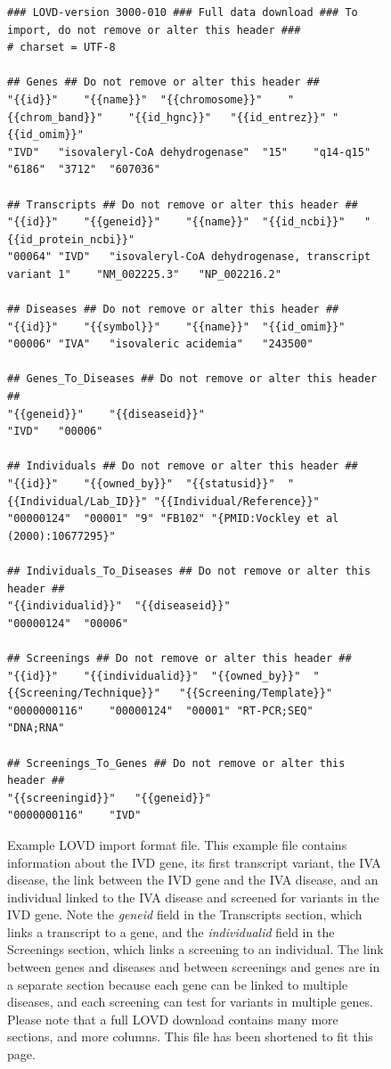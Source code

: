 \documentclass[a4paper,oneside,openany,12pt]{memoir}
\begin{document}
\begin{figure}[ht]
  \begin{shaded}
    \scriptsize
    \begin{verbatim}
### LOVD-version 3000-010 ### Full data download ### To import, do not remove or alter this header ###
# charset = UTF-8

## Genes ## Do not remove or alter this header ##
"{{id}}"	"{{name}}"	"{{chromosome}}"	"{{chrom_band}}"	"{{id_hgnc}}"	"{{id_entrez}}"	"{{id_omim}}"
"IVD"	"isovaleryl-CoA dehydrogenase"	"15"	"q14-q15"	"6186"	"3712"	"607036"

## Transcripts ## Do not remove or alter this header ##
"{{id}}"	"{{geneid}}"	"{{name}}"	"{{id_ncbi}}"	"{{id_protein_ncbi}}"
"00064"	"IVD"	"isovaleryl-CoA dehydrogenase, transcript variant 1"	"NM_002225.3"	"NP_002216.2"

## Diseases ## Do not remove or alter this header ##
"{{id}}"	"{{symbol}}"	"{{name}}"	"{{id_omim}}"
"00006"	"IVA"	"isovaleric acidemia"	"243500"

## Genes_To_Diseases ## Do not remove or alter this header ##
"{{geneid}}"	"{{diseaseid}}"
"IVD"	"00006"

## Individuals ## Do not remove or alter this header ##
"{{id}}"	"{{owned_by}}"	"{{statusid}}"	"{{Individual/Lab_ID}}"	"{{Individual/Reference}}"
"00000124"	"00001"	"9"	"FB102"	"{PMID:Vockley et al (2000):10677295}"

## Individuals_To_Diseases ## Do not remove or alter this header ##
"{{individualid}}"	"{{diseaseid}}"
"00000124"	"00006"

## Screenings ## Do not remove or alter this header ##
"{{id}}"	"{{individualid}}"	"{{owned_by}}"	"{{Screening/Technique}}"	"{{Screening/Template}}"
"0000000116"	"00000124"	"00001"	"RT-PCR;SEQ"	"DNA;RNA"

## Screenings_To_Genes ## Do not remove or alter this header ##
"{{screeningid}}"	"{{geneid}}"
"0000000116"	"IVD"
    \end{verbatim}
  \caption{%
    Example LOVD import format file.
    This example file contains information about the IVD gene, its first transcript variant, the IVA disease, the link between the IVD gene and the IVA disease,
     and an individual linked to the IVA disease and screened for variants in the IVD gene.
    Note the \emph{geneid} field in the Transcripts section, which links a transcript to a gene, and the \emph{individualid} field in the Screenings section, which links a screening to an individual.
    The link between genes and diseases and between screenings and genes are in a separate section because
     each gene can be linked to multiple diseases, and each screening can test for variants in multiple genes.
    Please note that a full LOVD download contains many more sections, and more columns.
    This file has been shortened to fit this page.}
  \end{shaded}
\end{figure}
\end{document}

